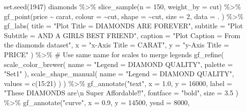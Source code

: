 \documentclass[
  letterpaper,
  DIV=11,
  numbers=noendperiod]{scrartcl}
\newenvironment{Shaded}{\begin{snugshade}}{\end{snugshade}}
\newcommand{\AttributeTok}[1]{\textcolor[rgb]{0.40,0.45,0.13}{#1}}
\newcommand{\CommentTok}[1]{\textcolor[rgb]{0.37,0.37,0.37}{#1}}
\newcommand{\DecValTok}[1]{\textcolor[rgb]{0.68,0.00,0.00}{#1}}
\newcommand{\FloatTok}[1]{\textcolor[rgb]{0.68,0.00,0.00}{#1}}
\newcommand{\FunctionTok}[1]{\textcolor[rgb]{0.28,0.35,0.67}{#1}}
\newcommand{\NormalTok}[1]{\textcolor[rgb]{0.00,0.23,0.31}{#1}}
\newcommand{\SpecialCharTok}[1]{\textcolor[rgb]{0.37,0.37,0.37}{#1}}
\newcommand{\StringTok}[1]{\textcolor[rgb]{0.13,0.47,0.30}{#1}}
\begin{document}
\begin{Shaded}
\begin{Highlighting}[]
\FunctionTok{set.seed}\NormalTok{(}\DecValTok{1947}\NormalTok{)}
\NormalTok{diamonds }\SpecialCharTok{\%\textgreater{}\%}
  \FunctionTok{slice\_sample}\NormalTok{(}\AttributeTok{n =} \DecValTok{150}\NormalTok{, }\AttributeTok{weight\_by =}\NormalTok{ cut) }\SpecialCharTok{\%\textgreater{}\%}
  \FunctionTok{gf\_point}\NormalTok{(price }\SpecialCharTok{\textasciitilde{}}\NormalTok{ carat,}
    \AttributeTok{colour =} \SpecialCharTok{\textasciitilde{}}\NormalTok{cut,}
    \AttributeTok{shape =} \SpecialCharTok{\textasciitilde{}}\NormalTok{cut,}
    \AttributeTok{size =} \DecValTok{2}\NormalTok{, }\AttributeTok{data =}\NormalTok{ .}
\NormalTok{  ) }\SpecialCharTok{\%\textgreater{}\%}
  \FunctionTok{gf\_labs}\NormalTok{(}
    \AttributeTok{title =} \StringTok{"Plot Title = DIAMONDS ARE FOREVER"}\NormalTok{,}
    \AttributeTok{subtitle =} \StringTok{"Plot Subtitle = AND A GIRL\textquotesingle{}S BEST FRIEND"}\NormalTok{,}
    \AttributeTok{caption =} \StringTok{"Plot Caption = From the diamonds dataset"}\NormalTok{,}
    \AttributeTok{x =} \StringTok{"x{-}Axis Title = CARAT"}\NormalTok{,}
    \AttributeTok{y =} \StringTok{"y{-}Axis Title = PRICE"}
\NormalTok{  ) }\SpecialCharTok{\%\textgreater{}\%}
  \CommentTok{\# Use same name for scales to merge legends}
  \FunctionTok{gf\_refine}\NormalTok{(}
    \FunctionTok{scale\_color\_brewer}\NormalTok{(}
      \AttributeTok{name =} \StringTok{"Legend = DIAMOND QUALITY"}\NormalTok{,}
      \AttributeTok{palette =} \StringTok{"Set1"}
\NormalTok{    ),}
    \FunctionTok{scale\_shape\_manual}\NormalTok{(}
      \AttributeTok{name =} \StringTok{"Legend = DIAMOND QUALITY"}\NormalTok{,}
      \AttributeTok{values =} \FunctionTok{c}\NormalTok{(}\DecValTok{15}\SpecialCharTok{:}\DecValTok{21}\NormalTok{)}
\NormalTok{    )}
\NormalTok{  ) }\SpecialCharTok{\%\textgreater{}\%}
  \FunctionTok{gf\_annotate}\NormalTok{(}\StringTok{"text"}\NormalTok{,}
    \AttributeTok{x =} \FloatTok{1.0}\NormalTok{, }\AttributeTok{y =} \DecValTok{16000}\NormalTok{,}
    \AttributeTok{label =} \StringTok{"These DIAMONDS are}\SpecialCharTok{\textbackslash{}n}\StringTok{ Super Affordable!!"}\NormalTok{,}
    \AttributeTok{fontface =} \StringTok{"bold"}\NormalTok{,}
    \AttributeTok{size =} \FloatTok{3.5}
\NormalTok{  ) }\SpecialCharTok{\%\textgreater{}\%}
  \FunctionTok{gf\_annotate}\NormalTok{(}\StringTok{"curve"}\NormalTok{,}
    \AttributeTok{x =} \FloatTok{0.9}\NormalTok{,}
    \AttributeTok{y =} \DecValTok{14500}\NormalTok{,}
    \AttributeTok{yend =} \DecValTok{8000}\NormalTok{,}

\end{Highlighting}
\end{Shaded}
\end{document}
